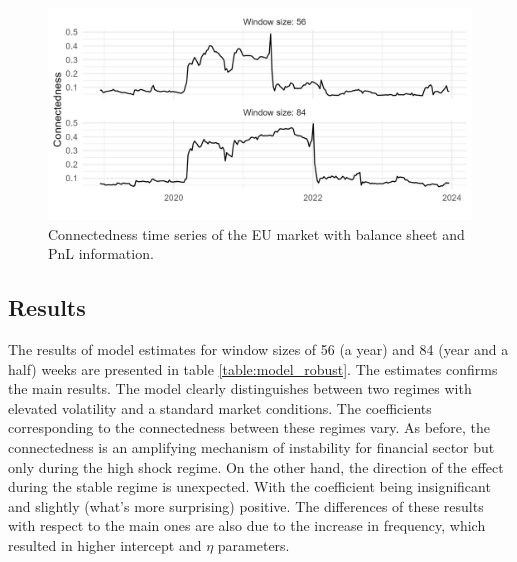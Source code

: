 \documentclass[12pt]{article}
\begin{document}
\begin{figure}
	\centering
	\includegraphics[scale = 0.9]{img/connect_bs.png}
	\caption{Connectedness time series of the EU market with balance sheet and PnL information.}
	\label{figure:connect_bs}
\end{figure}

\subsection{Results}

The results of model estimates for window sizes of 56 (a year) and 84 (year and a half) weeks are presented in table \ref{table:model_robust}. The estimates confirms the main results. The model clearly distinguishes between two regimes with elevated volatility and a standard market conditions. The coefficients corresponding to the connectedness between these regimes vary. As before, the connectedness is an amplifying mechanism of instability for financial sector but only during the high shock regime. On the other hand, the direction of the effect during the stable regime is unexpected. With the coefficient being insignificant and slightly (what's more surprising) positive. The differences of these results with respect to the main ones are also due to the increase in frequency, which resulted in higher intercept and $\eta$ parameters.  
\end{document}
